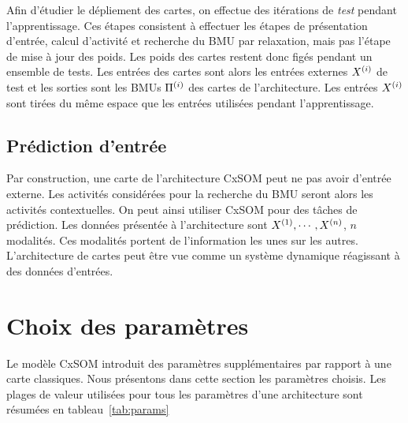 Afin d'étudier le dépliement des cartes, on effectue des itérations de \emph{test} pendant l'apprentissage. Ces étapes consistent à effectuer les étapes de présentation d'entrée, calcul d'activité et recherche du BMU par relaxation, mais pas l'étape de mise à jour des poids. Les poids des cartes restent donc figés pendant un ensemble de tests. Les entrées des cartes sont alors les entrées externes $X^{({i})}$ de test et les sorties sont les BMUs $\Pi^{({i})}$ des cartes de l'architecture. 
Les entrées $X^{({i})}$ sont tirées du même espace que les entrées utilisées pendant l'apprentissage.

\subsection{Prédiction d'entrée}
Par construction, une carte de l'architecture CxSOM peut ne pas avoir d'entrée externe. Les activités considérées pour la recherche du BMU seront alors les activités contextuelles. On peut ainsi utiliser CxSOM pour des tâches de prédiction. Les données présentée à l'architecture sont $X^{({1})}, \cdots, X^{({n})}$, $n$ modalités. Ces modalités portent de l'information les unes sur les autres. 
L'architecture de cartes peut être vue comme un système dynamique réagissant à des données d'entrées.

\section{Choix des paramètres}\label{sec:params}

Le modèle CxSOM introduit des paramètres supplémentaires par rapport à une carte classiques. Nous présentons dans cette section les paramètres choisis. Les plages de valeur utilisées pour tous les paramètres d'une architecture sont résumées en tableau~\ref{tab:params}
